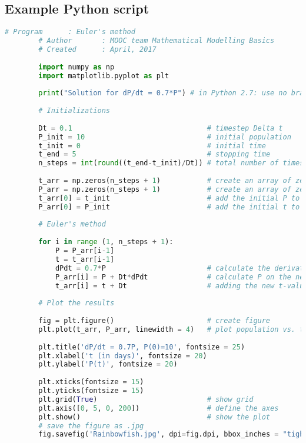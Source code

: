 \begin{appendices}

    \section{Example Python script}

    \begin{lstlisting}[language=Python, caption={Example Python script \citep{tudelftopencourseware}}]
        # Program      : Euler's method
        # Author       : MOOC team Mathematical Modelling Basics
        # Created      : April, 2017
        
        import numpy as np
        import matplotlib.pyplot as plt
        
        print("Solution for dP/dt = 0.7*P")	# in Python 2.7: use no brackets
        
        # Initializations
        
        Dt = 0.1                                # timestep Delta t
        P_init = 10                             # initial population 
        t_init = 0                              # initial time
        t_end = 5                               # stopping time
        n_steps = int(round((t_end-t_init)/Dt)) # total number of timesteps
        
        t_arr = np.zeros(n_steps + 1)           # create an array of zeros for t
        P_arr = np.zeros(n_steps + 1)           # create an array of zeros for P
        t_arr[0] = t_init                       # add the initial P to the array
        P_arr[0] = P_init                       # add the initial t to the array
        
        # Euler's method
        
        for i in range (1, n_steps + 1):
            P = P_arr[i-1]
            t = t_arr[i-1]
            dPdt = 0.7*P                        # calculate the derivative 
            P_arr[i] = P + Dt*dPdt              # calculate P on the next time step
            t_arr[i] = t + Dt                   # adding the new t-value to the list
        
        # Plot the results
        
        fig = plt.figure()                      # create figure
        plt.plot(t_arr, P_arr, linewidth = 4)   # plot population vs. time
        
        plt.title('dP/dt = 0.7P, P(0)=10', fontsize = 25)  
        plt.xlabel('t (in days)', fontsize = 20)
        plt.ylabel('P(t)', fontsize = 20)
        
        plt.xticks(fontsize = 15)
        plt.yticks(fontsize = 15)
        plt.grid(True)                          # show grid 
        plt.axis([0, 5, 0, 200])                # define the axes
        plt.show()                              # show the plot
        # save the figure as .jpg
        fig.savefig('Rainbowfish.jpg', dpi=fig.dpi, bbox_inches = "tight")
    \end{lstlisting}
    
\end{appendices}